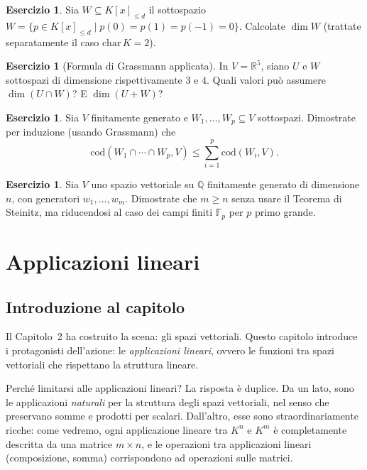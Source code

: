 \documentclass[11pt, a4paper]{book}
\theoremstyle{definition}
\newtheorem{esercizio}[definizione]{Esercizio}
\theoremstyle{plain}
\theoremstyle{remark}
\newcommand{\Q}{\mathbb{Q}}
\newcommand{\R}{\mathbb{R}}
\begin{document}
\begin{esercizio}
Sia $W \subseteq K[x]_{\leq d}$ il sottospazio $W = \{p \in K[x]_{\leq d} \mid p(0)=p(1)=p(-1)=0\}$. Calcolate $\dim W$ (trattate separatamente il caso $\mathrm{char}\, K = 2$).
\end{esercizio}

\begin{esercizio}[Formula di Grassmann applicata]
In $V = \R^5$, siano $U$ e $W$ sottospazi di dimensione rispettivamente $3$ e $4$. Quali valori può assumere $\dim(U \cap W)$? E $\dim(U + W)$?
\end{esercizio}

\begin{esercizio}
Sia $V$ finitamente generato e $W_1, \ldots, W_p \subseteq V$ sottospazi. Dimostrate per induzione (usando Grassmann) che
\[
  \mathrm{cod}(W_1 \cap \cdots \cap W_p, V) \leq \sum_{i=1}^p \mathrm{cod}(W_i, V).
\]
\end{esercizio}

\begin{esercizio}
Sia $V$ uno spazio vettoriale su $\Q$ finitamente generato di dimensione $n$, con generatori $w_1, \ldots, w_m$. Dimostrate che $m \geq n$ senza usare il Teorema di Steinitz, ma riducendosi al caso dei campi finiti $\mathbb{F}_p$ per $p$ primo grande.
\end{esercizio}

\chapter{Applicazioni lineari}
\label{cap:applin}

\section*{Introduzione al capitolo}

Il Capitolo~2 ha costruito la scena: gli spazi vettoriali. Questo capitolo introduce i protagonisti dell'azione: le \emph{applicazioni lineari}, ovvero le funzioni tra spazi vettoriali che rispettano la struttura lineare.

Perché limitarsi alle applicazioni lineari? La risposta è duplice. Da un lato, sono le applicazioni \emph{naturali} per la struttura degli spazi vettoriali, nel senso che preservano somme e prodotti per scalari. Dall'altro, esse sono straordinariamente ricche: come vedremo, ogni applicazione lineare tra $K^n$ e $K^m$ è completamente descritta da una matrice $m \times n$, e le operazioni tra applicazioni lineari (composizione, somma) corrispondono ad operazioni sulle matrici.
\end{document}
